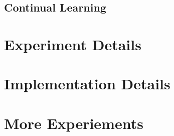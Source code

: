 \onecolumn
\appendix
\setcounter{equation}{0}
\setcounter{section}{0}
\setcounter{subsection}{0}
\renewcommand{\theequation}{\arabic{equation}}
\renewcommand\thesection{\Alph{section}}
\renewcommand{\thesubsection}{\arabic{subsection}}
\label{app:Mask-RCNN}

\subsection{Continual Learning}


\section{Experiment Details}
\label{app:exp_details}


\section{Implementation Details}
\section{More Experiements}
\label{app:exps}
